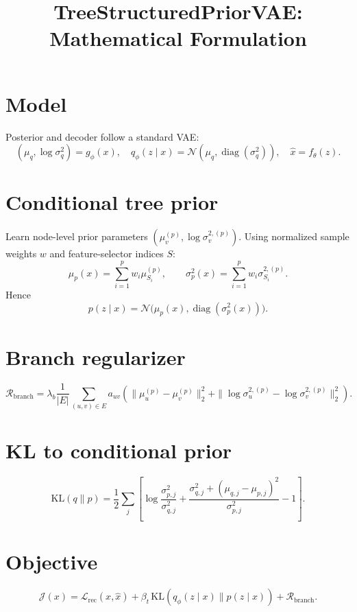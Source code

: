 \documentclass[11pt]{article}
\title{TreeStructuredPriorVAE: Mathematical Formulation}
\date{}
\begin{document}
\maketitle

\section{Model}
Posterior and decoder follow a standard VAE:
\begin{equation}
(\mu_q,\log\sigma_q^2)=g_\phi(x),\quad q_\phi(z\mid x)=\mathcal N(\mu_q,\operatorname{diag}(\sigma_q^2)),\quad \hat x=f_\theta(z).
\end{equation}

\section{Conditional tree prior}
Learn node-level prior parameters $(\mu_v^{(p)},\log\sigma_v^{2,(p)})$. Using normalized sample weights $w$ and feature-selector indices $S$:
\begin{equation}
\mu_p(x)=\sum_{i=1}^p w_i\mu_{S_i}^{(p)},\qquad
\sigma_p^2(x)=\sum_{i=1}^p w_i\sigma_{S_i}^{2,(p)}.
\end{equation}
Hence
\begin{equation}
p(z\mid x)=\mathcal N\big(\mu_p(x),\operatorname{diag}(\sigma_p^2(x))\big).
\end{equation}

\section{Branch regularizer}
\begin{equation}
\mathcal R_{\mathrm{branch}}
=\lambda_b\frac{1}{|E|}\sum_{(u,v)\in E}a_{uv}\left(\|\mu_u^{(p)}-\mu_v^{(p)}\|_2^2+\|\log\sigma_u^{2,(p)}-\log\sigma_v^{2,(p)}\|_2^2\right).
\end{equation}

\section{KL to conditional prior}
\begin{equation}
\mathrm{KL}(q\|p)=\frac12\sum_j\left[\log\frac{\sigma_{p,j}^2}{\sigma_{q,j}^2}+\frac{\sigma_{q,j}^2+(\mu_{q,j}-\mu_{p,j})^2}{\sigma_{p,j}^2}-1\right].
\end{equation}

\section{Objective}
\begin{equation}
\mathcal J(x)=\mathcal L_{\mathrm{rec}}(x,\hat x)+\beta_t\,\mathrm{KL}(q_\phi(z\mid x)\|p(z\mid x))+\mathcal R_{\mathrm{branch}}.
\end{equation}
\end{document}
